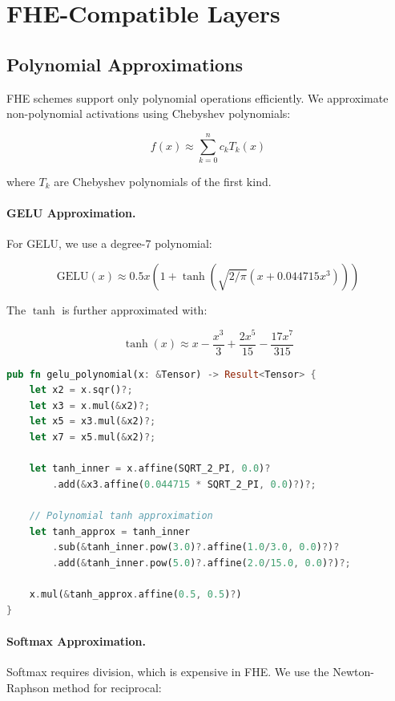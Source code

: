 \section{FHE-Compatible Layers}


\subsection{Polynomial Approximations}

FHE schemes support only polynomial operations efficiently. We approximate non-polynomial activations using Chebyshev polynomials:

\begin{equation}
    f(x) \approx \sum_{k=0}^{n} c_k T_k(x)
\end{equation}

where $T_k$ are Chebyshev polynomials of the first kind.

\paragraph{GELU Approximation.} For GELU, we use a degree-7 polynomial:

\begin{equation}
    \text{GELU}(x) \approx 0.5x(1 + \tanh(\sqrt{2/\pi}(x + 0.044715x^3)))
\end{equation}

The $\tanh$ is further approximated with:

\begin{equation}
    \tanh(x) \approx x - \frac{x^3}{3} + \frac{2x^5}{15} - \frac{17x^7}{315}
\end{equation}

\begin{lstlisting}[language=Rust]
pub fn gelu_polynomial(x: &Tensor) -> Result<Tensor> {
    let x2 = x.sqr()?;
    let x3 = x.mul(&x2)?;
    let x5 = x3.mul(&x2)?;
    let x7 = x5.mul(&x2)?;

    let tanh_inner = x.affine(SQRT_2_PI, 0.0)?
        .add(&x3.affine(0.044715 * SQRT_2_PI, 0.0)?)?;

    // Polynomial tanh approximation
    let tanh_approx = tanh_inner
        .sub(&tanh_inner.pow(3.0)?.affine(1.0/3.0, 0.0)?)?
        .add(&tanh_inner.pow(5.0)?.affine(2.0/15.0, 0.0)?)?;

    x.mul(&tanh_approx.affine(0.5, 0.5)?)
}
\end{lstlisting}

\paragraph{Softmax Approximation.} Softmax requires division, which is expensive in FHE. We use the Newton-Raphson method for reciprocal:

